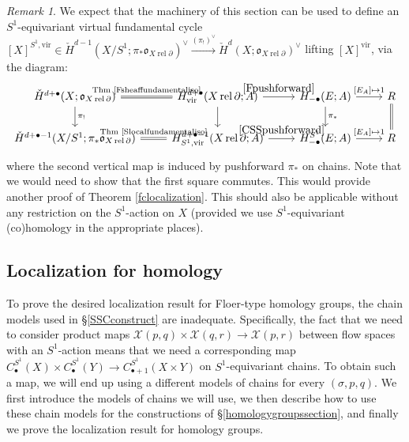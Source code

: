 \documentclass[12pt]{article}
\theoremstyle{definition}
\theoremstyle{remark}
\newtheorem{remark}[theorem]{Remark}
\numberwithin{equation}{subsection}
\newcommand{\oo}{\mathfrak o}
\newcommand{\X}{\mathcal X}
\newcommand{\cH}{\check H}
\newcommand{\vir}{\mathrm{vir}}
\newcommand{\rel}{\operatorname{rel}}
\begin{document}
\begin{remark}\label{SSequivariantvfcmaybe}
We expect that the machinery of this section can be used to define an $S^1$-equivariant virtual fundamental cycle $[X]^{S^1,\vir}\in\cH^{d-1}(X/S^1;\pi_\ast\oo_{X\rel\partial})^\vee\xrightarrow{(\pi_!)^\vee}\cH^d(X;\oo_{X\rel\partial})^\vee$ lifting $[X]^\vir$, via the diagram:
\begin{equation*}%
\begin{tikzcd}
\cH^{d+\bullet}(X;\oo_{X\rel\partial})\ar{d}{\pi_!}\ar[equal]{r}{\text{Thm \ref{Fsheaffundamentaliso}}}&H^{d+\bullet}_\vir(X\rel\partial;A)\ar{d}\ar{r}{\eqref{Fpushforward}}&H_{-\bullet}(E;A)\ar{d}{\pi_\ast}\ar{r}{[E_A]\mapsto 1}&R\ar[equal]{d}\\
\cH^{d+\bullet-1}(X/S^1;\pi_\ast\oo_{X\rel\partial})\ar[equal]{r}{\text{Thm \ref{Slocalfundamentaliso}}}&H^{d+\bullet-1}_{S^1,\vir}(X\rel\partial;A)\ar{r}{\eqref{CSSpushforward}}&H_{-\bullet}^{S^1}(E;A)\ar{r}{[E_A]\mapsto 1}&R
\end{tikzcd}
\end{equation*}
where the second vertical map is induced by pushforward $\pi_\ast$ on chains.  Note that we would need to show that the first square commutes.  This would provide another proof of Theorem \ref{fclocalization}.  This should also be applicable without any restriction on the $S^1$-action on $X$ (provided we use $S^1$-equivariant (co)homology in the appropriate places).
\end{remark}

\subsection{Localization for homology}\label{homologylocalizationsection}

To prove the desired localization result for Floer-type homology groups, the chain models used in \S\ref{SSCconstruct} are inadequate.  Specifically, the fact that we need to consider product maps $\X(p,q)\times\X(q,r)\to\X(p,r)$ between flow spaces with an $S^1$-action means that we need a corresponding map $C_\bullet^{S^1}(X)\times C_\bullet^{S^1}(Y)\to C_{\bullet+1}^{S^1}(X\times Y)$ on $S^1$-equivariant chains.  To obtain such a map, we will end up using a different models of chains for every $(\sigma,p,q)$.  We first introduce the models of chains we will use, we then describe how to use these chain models for the constructions of \S\ref{homologygroupssection}, and finally we prove the localization result for homology groups.
\end{document}
